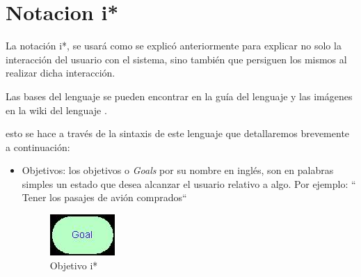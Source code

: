 \section{Notacion i*}
    \par La notación \gls{i*}, se usará como se explicó anteriormente para explicar no solo la interacción del usuario con el sistema, sino también que persiguen los mismos al realizar dicha interacción.
    \par Las bases del lenguaje se pueden encontrar en la guía del lenguaje \cite{Dalpiaz2016} y las imágenes en la wiki del lenguaje \cite{No-mention2011}.
    \par esto se hace a través de la sintaxis de este lenguaje que detallaremos brevemente a continuación:
    \begin{itemize}
        \item Objetivos: los objetivos o \textit{Goals} por su nombre en inglés, son en palabras simples un estado que desea alcanzar el usuario relativo a algo. Por ejemplo: `` Tener los pasajes de avión comprados``
        \begin{figure}[H]
            \centering
            \includegraphics{media/imagenes/i_star/sintaxis/goal.jpg}
            \caption{Objetivo \gls{i*}}
        \end{figure}


\end{itemize}
